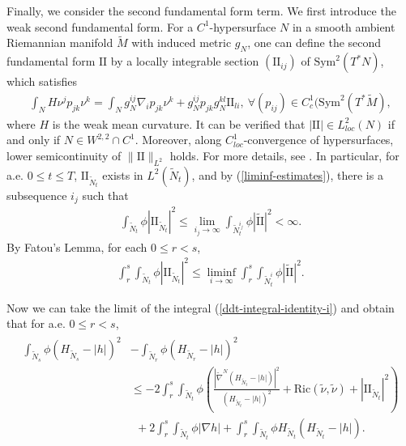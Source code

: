 \documentclass[11pt, letterpaper]{amsart}
\theoremstyle{definition}
\theoremstyle{remark}
\begin{document}
Finally, we consider the second fundamental form term. 
We first introduce the weak second fundamental form. For a $C^1$-hypersurface $N$ in a smooth ambient Riemannian manifold $\tilde{M}$ with induced metric $g_{N}$, one can define the second fundamental form $\mathrm{II}$ by a locally integrable section $(\mathrm{II}_{ij})$ of $\mathrm{Sym}^2(T^*N)$, which satisfies 
\begin{align*}
	\int_{N} H \nu ^{j} p_{jk} \nu ^{k} = \int_{N} g_{N}^{ij} \nabla _{i} p_{jk} \nu ^{k} + g_{N}^{ij} p_{jk} g_{N}^{kl} \mathrm{II}_{li}, \ \forall (p_{ij}) \in C^{1}_{c}(\mathrm{Sym}^2(T^* \tilde{M}),
\end{align*} 
where $H$ is the weak mean curvature. It can be verified that $|\mathrm{II}| \in L^2_{loc}(N)$ if and only if $N \in W^{2,2}\cap C^1$. Moreover, along $C^{1}_{loc}$-convergence of hypersurfaces, lower semicontinuity of $\|\mathrm{II}\|_{L^2}$ holds. For more details, see \cite[Section 5]{HI01}. In particular, for a.e. $0\leq t \leq T$, $ \mathrm{II}_{\tilde{N}_{t}} $ exists in $L^2(\tilde{N}_{t})$, and by (\ref{liminf-estimates}), there is a subsequence $i_j$ such that
\begin{align*}
	\int_{\tilde{N}_t} \phi |\mathrm{II}_{\tilde{N}_t}|^2 \leq \lim_{i_j \to \infty} \int_{\tilde{N}^{i_j}_{t}} \phi |\tilde{\mathrm{II}}|^2 < \infty.
\end{align*} 
By Fatou's Lemma, for each $0 \leq r<s$,
\begin{align*}
	\int_{r}^{s} \int_{\tilde{N}_t} \phi |\mathrm{II}_{\tilde{N}_t}|^2 \leq \liminf_{i\to \infty} \int_{r}^{s} \int_{\tilde{N}^{i}_t} \phi |\tilde{\mathrm{II}}|^2.
\end{align*} 

Now we can take the limit of the integral (\ref{ddt-integral-identity-i}) and obtain that for a.e. $0\leq r<s$,
\begin{align}
	\begin{split}
		\int_{\tilde{N}_s} \phi (H_{\tilde{N}_s} - |h| )^2 & - \int_{\tilde{N}_r} \phi (H_{\tilde{N}_r} - |h| )^2 \\
								   &\leq - 2 \int_{r}^{s} \int_{\tilde{N}_t} \phi \left( \frac{|\tilde{\nabla }^{N} (H_{\tilde{N}_t} -|h|)|^2}{(H_{\tilde{N}_t} - |h|)^2} + \mathrm{Ric}(\tilde{\nu }, \tilde{\nu }) + |\mathrm{II}_{\tilde{N}_t}|^2 \right) \\
								   &\ \ + 2 \int_{r}^{s} \int_{\tilde{N}_{t}} \phi |\nabla h| + \int_{r}^{s} \int_{\tilde{N}_t} \phi H_{\tilde{N}_t}(H_{\tilde{N}_t} - |h|).
	\end{split}
\end{align}
\end{document}
